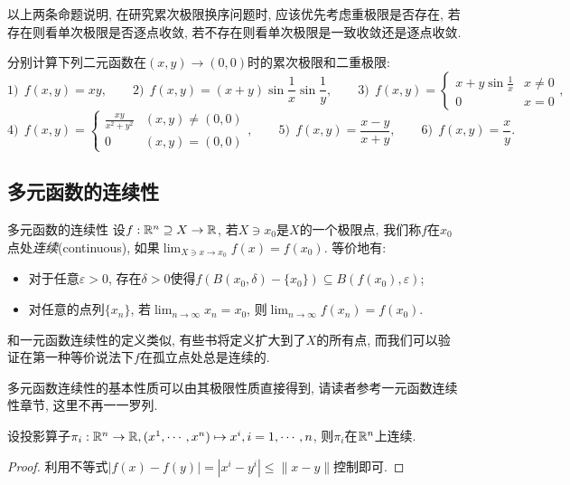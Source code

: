 以上两条命题说明, 在研究累次极限换序问题时, 应该优先考虑重极限是否存在, 若存在则看单次极限是否逐点收敛, 若不存在则看单次极限是一致收敛还是逐点收敛. 

\begin{example}
	分别计算下列二元函数在$(x,y) \to (0,0)$时的累次极限和二重极限: $$1)~~f(x,y) = xy,\qquad 2)~~f(x,y) = (x+y)\sin \frac{1}{x} \sin \frac{1}{y},\qquad 3)~~f(x,y) = \begin{cases} x+y\sin \frac{1}{x} & x\neq 0 \\ 0 & x=0 \end{cases}, $$
	$$4)~~f(x,y) = \begin{cases} \frac{xy}{x^2+y^2} &  (x,y) \neq (0,0) \\ 0 &  (x,y) = (0,0) \end{cases},\qquad 5)~~f(x,y)=\frac{x-y}{x+y},\qquad 6)~~f(x,y)=\frac{x}{y}. $$
\end{example}

\subsection{多元函数的连续性}

\begin{definition}{多元函数的连续性}
	设$f:\mathbb{R} ^n \supseteq X \to \mathbb{R}$, 若$X \ni x_0$是$X$的一个极限点, 我们称$f$在$x_0$点处\textit{连续}(continuous), 如果$\lim_{X \ni x \to x_0} f(x) = f(x_0)$. 等价地有: 
	\begin{itemize}
		\item 对于任意$\varepsilon >0$, 存在$\delta >0$使得$f(B(x_0,\delta) - \{ x_0 \}) \subseteq B(f(x_0),\varepsilon)$; 
		\item 对任意的点列$\{ x_n \}$, 若$\lim_{n \to \infty} x_n = x_0$, 则$\lim_{n \to \infty} f(x_n) = f(x_0)$. 
	\end{itemize}
\end{definition}
\begin{remark}
	和一元函数连续性的定义类似, 有些书将定义扩大到了$X$的所有点, 而我们可以验证在第一种等价说法下$f$在孤立点处总是连续的. 
\end{remark}

多元函数连续性的基本性质可以由其极限性质直接得到, 请读者参考一元函数连续性章节, 这里不再一一罗列. 

\begin{example}
	设投影算子$\pi _i :\mathbb{R} ^n \to \mathbb{R} ,(x^1,\cdots ,x^n) \mapsto x^i,i=1,\cdots ,n$, 则$\pi _i$在$\mathbb{R} ^n$上连续. 
\end{example}
\begin{proof}
	利用不等式$|f(x)-f(y)|=|x^i - y^i| \leq \| x-y \|$控制即可. 
\end{proof}

